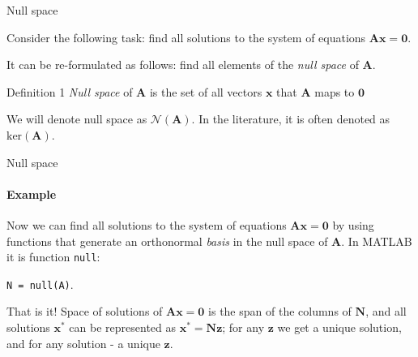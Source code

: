 \documentclass{beamer}
\begin{document}
\begin{frame}{Null space}
\begin{flushleft}

Consider the following task: find all solutions to the system of equations $\mathbf{A} \mathbf{x} = \mathbf{0}$.

\bigskip

It can be re-formulated as follows: find all elements of the \emph{null space} of $\mathbf{A}$.

\begin{block}{Definition 1}
  \emph{Null space} of $\mathbf{A}$ is the set of all vectors $\mathbf{x}$ that $\mathbf{A}$ maps to $\mathbf{0}$
\end{block}

\bigskip

We will denote null space as $\mathcal{N}(\mathbf{A})$. In the literature, it is often denoted as $\text{ker}(\mathbf{A})$.

\end{flushleft}
\end{frame}


\begin{frame}{Null space}
\framesubtitle{Example}
\begin{flushleft}

Now we can find all solutions to the system of equations $\mathbf{A} \mathbf{x} = \mathbf{0}$ by using functions that generate an orthonormal \emph{basis} in the null space of $\mathbf{A}$. In MATLAB it is function \texttt{null}:

\bigskip

\texttt{N = null(A)}.

\bigskip

That is it! Space of solutions of $\mathbf{A} \mathbf{x} = \mathbf{0}$ is the span of the columns of $\mathbf{N}$, and all solutions $\mathbf{x}^*$ can be represented as $\mathbf{x}^* = \mathbf{N}\mathbf{z}$; for any $\mathbf{z}$ we get a unique solution, and for any solution - a unique $\mathbf{z}$.

\end{flushleft}
\end{frame}
\end{document}
